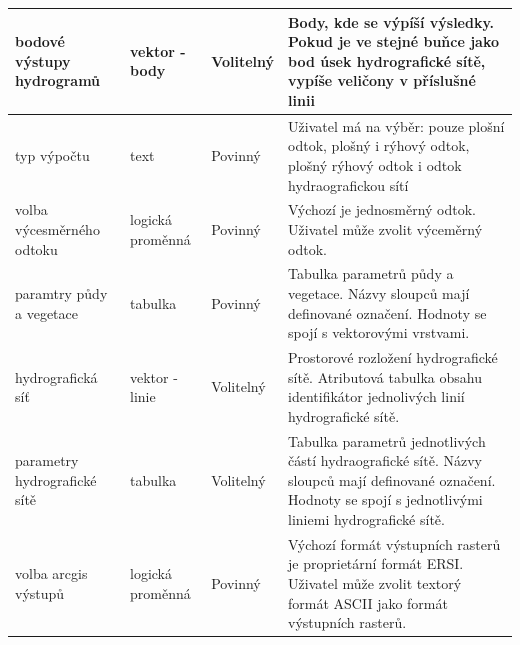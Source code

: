 \begin{table}[]
{\begin{tabular}{p{4cm}lp{2cm}p{5cm}}
bodové výstupy hydrogramů          & \cellcolor[HTML]{FCFF2F}vektor - body                 & Volitelný         & Body, kde se výpíší výsledky. Pokud je ve stejné buňce jako bod úsek hydrografické sítě, vypíše veličony v příslušné linii                                    \\ \hline
typ výpočtu                        & text                                                  & Povinný           & Uživatel má na výběr: pouze plošní odtok, plošný i rýhový odtok, plošný rýhový odtok i odtok hydraografickou sítí                                             \\ \hline
volba výcesměrného odtoku          & \cellcolor[HTML]{9698ED}logická proměnná              & Povinný           & Výchozí je jednosměrný odtok. Uživatel může zvolit výceměrný odtok.                                                                                           \\ \hline
paramtry půdy a vegetace           & \cellcolor[HTML]{67FD9A}tabulka                       & Povinný           & Tabulka parametrů půdy a vegetace. Názvy sloupců mají definované označení. Hodnoty se spojí s vektorovými vrstvami.                                           \\ \hline
hydrografická síť                  & \cellcolor[HTML]{F8FF00}vektor - linie                & Volitelný         & Prostorové rozložení hydrografické sítě. Atributová tabulka obsahu identifikátor jednolivých linií hydrografické sítě.                                        \\ \hline
parametry hydrografické sítě       & \cellcolor[HTML]{67FD9A}tabulka                       & Volitelný         & Tabulka parametrů jednotlivých částí hydraografické sítě. Názvy sloupců mají definované označení. Hodnoty se spojí s jednotlivými liniemi hydrografické sítě. \\ \hline
volba arcgis výstupů               & \cellcolor[HTML]{9698ED}logická proměnná              & Povinný           & Výchozí formát výstupních rasterů je proprietární formát ERSI. Uživatel může zvolit textorý formát ASCII jako formát výstupních rasterů.                      \\ \hline
\end{tabular}
}
\end{table}
